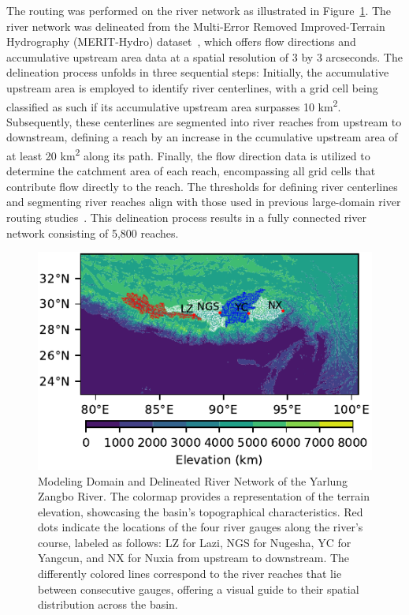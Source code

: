 \documentclass[draft]{agujournal2019}
\begin{document}
The routing was performed on the river network as illustrated in Figure~\ref{fig:domain}. The river network was delineated from the Multi-Error Removed Improved-Terrain Hydrography (MERIT-Hydro) dataset~\cite{yamazaki2017GRL, yamazaki2019WRR}, which offers flow directions and accumulative upstream area data at a spatial resolution of 3 by 3 arcseconds. The delineation process unfolds in three sequential steps: Initially, the accumulative upstream area is employed to identify river centerlines, with a grid cell being classified as such if its accumulative upstream area surpasses 10 km\textsuperscript{2}. Subsequently, these centerlines are segmented into river reaches from upstream to downstream, defining a reach by an increase in the ccumulative upstream area of at least 20 km\textsuperscript{2} along its path. Finally, the flow direction data is utilized to determine the catchment area of each reach, encompassing all grid cells that contribute flow directly to the reach. The thresholds for defining river centerlines and segmenting river reaches align with those used in previous large-domain river routing studies~\cite{lin2021SD, lin2019WRR}. This delineation process results in a fully connected river network consisting of 5,800 reaches.

\begin{figure}[h!]
      \centering
      \noindent\includegraphics[width=140mm]{domain.pdf}
      \caption{Modeling Domain and Delineated River Network of the Yarlung Zangbo River. The colormap provides a representation of the terrain elevation, showcasing the basin's topographical characteristics. Red dots indicate the locations of the four river gauges along the river's course, labeled as follows: LZ for Lazi, NGS for Nugesha, YC for Yangcun, and NX for Nuxia from upstream to downstream. The differently colored lines correspond to the river reaches that lie between consecutive gauges, offering a visual guide to their spatial distribution across the basin.}
      \label{fig:domain}
\end{figure}
\end{document}
